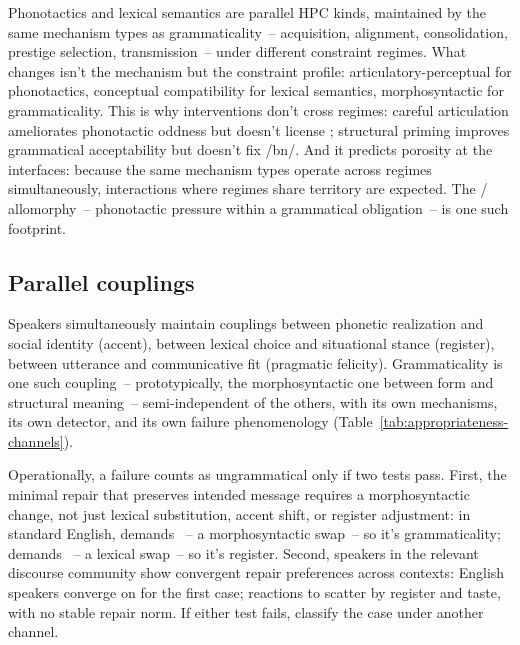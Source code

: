 Phonotactics and lexical semantics are parallel HPC kinds, maintained by the same mechanism types as grammaticality~-- acquisition, alignment, consolidation, prestige selection, transmission~-- under different constraint regimes. What changes isn't the mechanism but the constraint profile: articulatory-perceptual for phonotactics, conceptual compatibility for lexical semantics, morphosyntactic for grammaticality. This is why interventions don't cross regimes: careful articulation ameliorates phonotactic oddness but doesn't license \ungram{}; structural priming improves grammatical acceptability but doesn't fix /bn/. And it predicts porosity at the interfaces: because the same mechanism types operate across regimes simultaneously, interactions where regimes share territory are expected. The / allomorphy~-- phonotactic pressure within a grammatical obligation~-- is one such footprint.

\subsection{Parallel couplings}
\label{sec:15:appropriateness}

Speakers simultaneously maintain couplings between phonetic realization and social identity (accent), between lexical choice and situational stance (register), between utterance and communicative fit (pragmatic felicity). Grammaticality is one such coupling~-- prototypically, the morphosyntactic one between form and structural meaning~-- semi-independent of the others, with its own mechanisms, its own detector, and its own failure phenomenology (Table~\ref{tab:appropriateness-channels}).

Operationally, a failure counts as ungrammatical only if two tests pass. First, the minimal repair that preserves intended message requires a morphosyntactic change, not just lexical substitution, accent shift, or register adjustment: in standard English, \ungram{} demands ~-- a morphosyntactic swap~-- so it's grammaticality;  demands ~-- a lexical swap~-- so it's register. Second, speakers in the relevant discourse community show convergent repair preferences across contexts: English speakers converge on  for the first case; reactions to  scatter by register and taste, with no stable repair norm. If either test fails, classify the case under another channel.

